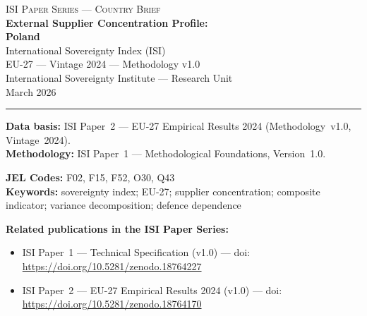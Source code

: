 \documentclass[12pt,a4paper]{article}
\begin{document}
\hypersetup{pageanchor=false}

\begin{titlepage}
\centering
\vspace*{2cm}
{\Large\textsc{ISI Paper Series --- Country Brief}}\\[1.2cm]
{\LARGE\bfseries External Supplier Concentration Profile:\\[0.3em]
Poland}\\[1.5cm]
{\large International Sovereignty Index (ISI)\\[0.3em]
EU-27 --- Vintage 2024 --- Methodology v1.0}\\[1.2cm]
{\large International Sovereignty Institute --- Research Unit}\\[0.8cm]
{\large March 2026}

\vspace{0.8cm}
\noindent\rule{\textwidth}{0.4pt}
\vspace{0.4cm}

\begin{flushleft}
\noindent\textbf{Data basis:} ISI Paper~2 --- EU-27 Empirical Results 2024 (Methodology~v1.0, Vintage~2024).\\[4pt]
\noindent\textbf{Methodology:} ISI Paper~1 --- Methodological Foundations, Version~1.0.

\medskip

\noindent\textbf{JEL Codes:} F02, F15, F52, O30, Q43\\[4pt]
\noindent\textbf{Keywords:} sovereignty index; EU-27; supplier concentration; composite indicator; variance decomposition; defence dependence

\medskip

\noindent\textbf{Related publications in the ISI Paper Series:}
\begin{itemize}[nosep,leftmargin=1.5em]
\item ISI Paper~1 --- Technical Specification (v1.0) --- doi:\\
  \url{https://doi.org/10.5281/zenodo.18764227}
\item ISI Paper~2 --- EU-27 Empirical Results 2024 (v1.0) --- doi:\\
  \url{https://doi.org/10.5281/zenodo.18764170}
\end{itemize}
\end{flushleft}
\vfill
\end{titlepage}
\end{document}
